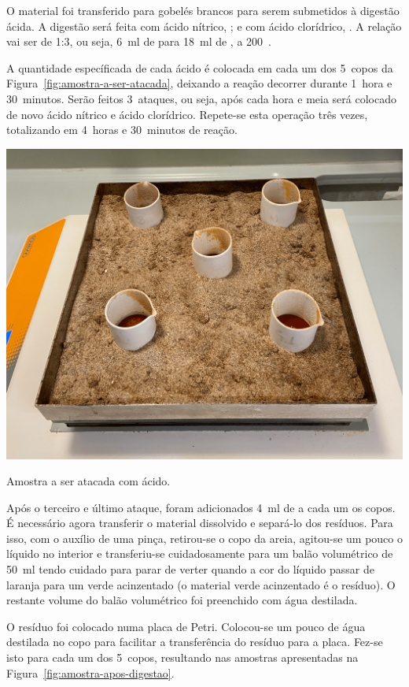 O material foi transferido para gobelés brancos para serem submetidos à digestão ácida.
A digestão será feita com ácido nítrico, ; e com ácido clorídrico, .
A relação vai ser de 1:3, ou seja, 6~ml de  para 18~ml de , a 200~\graus.

A quantidade específicada de cada ácido é colocada em cada um dos 5~copos da Figura~\ref{fig:amostra-a-ser-atacada}, deixando a reação decorrer durante 1~hora e 30~minutos.
Serão feitos 3~ataques, ou seja, após cada hora e meia será colocado de novo ácido nítrico e ácido clorídrico.
Repete-se esta operação três vezes, totalizando em 4~horas e 30~minutos de reação.
\begin{marginfigure}[\baselineskip]
    \centering
    \includegraphics[width=0.9\linewidth]{figures/Amostra a ser atacada - digestão ácida}
    \caption{Amostra a ser atacada com ácido.}
    \label{fig:amostra-a-ser-atacada}
\end{marginfigure}

Após o terceiro e último ataque, foram adicionados 4~ml de  a cada um os copos.
É necessário agora transferir o material dissolvido e separá-lo dos resíduos.
Para isso, com o auxílio de uma pinça, retirou-se o copo da areia, agitou-se um pouco o líquido no interior e transferiu-se cuidadosamente para um balão volumétrico de 50~ml tendo cuidado para parar de verter quando a cor do líquido passar de laranja para um verde acinzentado (o material verde acinzentado é o resíduo).
O restante volume do balão volumétrico foi preenchido com água destilada.

O resíduo foi colocado numa placa de Petri.
Colocou-se um pouco de água destilada no copo para facilitar a transferência do resíduo para a placa.
Fez-se isto para cada um dos 5~copos, resultando nas amostras apresentadas na Figura~\ref{fig:amostra-apos-digestao}.

